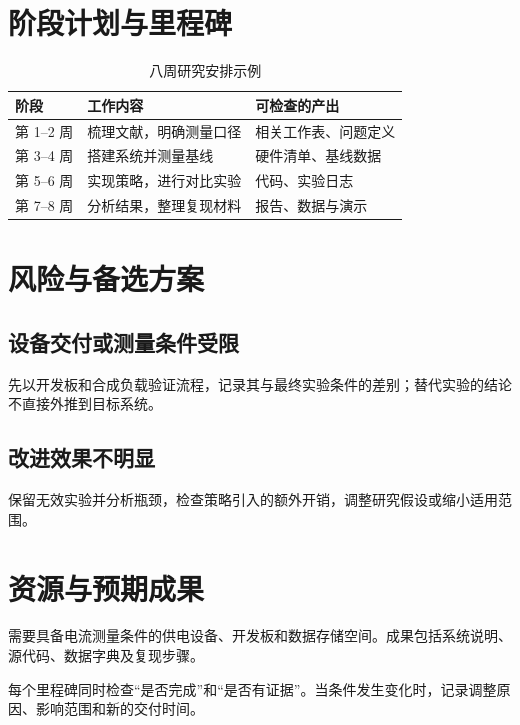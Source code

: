 \documentclass[UTF8,fontset=fandol,a4paper,zihao=-4]{ctexart}
\begin{document}
\section{阶段计划与里程碑}
\begin{table}[htbp]\centering
\caption{八周研究安排示例}
\begin{tabularx}{\linewidth}{@{}lXX@{}}\toprule
阶段 & 工作内容 & 可检查的产出\\\midrule
第 1--2 周 & 梳理文献，明确测量口径 & 相关工作表、问题定义\\
第 3--4 周 & 搭建系统并测量基线 & 硬件清单、基线数据\\
第 5--6 周 & 实现策略，进行对比实验 & 代码、实验日志\\
第 7--8 周 & 分析结果，整理复现材料 & 报告、数据与演示\\\bottomrule
\end{tabularx}
\end{table}
\section{风险与备选方案}
\subsection{设备交付或测量条件受限}
先以开发板和合成负载验证流程，记录其与最终实验条件的差别；替代实验的结论不直接外推到目标系统。
\subsection{改进效果不明显}
保留无效实验并分析瓶颈，检查策略引入的额外开销，调整研究假设或缩小适用范围。
\section{资源与预期成果}
需要具备电流测量条件的供电设备、开发板和数据存储空间。成果包括系统说明、源代码、数据字典及复现步骤。
\begin{summarybox}[阶段验收]
每个里程碑同时检查“是否完成”和“是否有证据”。当条件发生变化时，记录调整原因、影响范围和新的交付时间。
\end{summarybox}
\end{document}

